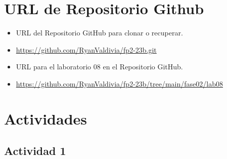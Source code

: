 \documentclass{article}
\begin{document}
	\section{URL de Repositorio Github}
	\begin{itemize}
		\item URL del Repositorio GitHub para clonar o recuperar.
		\item \url{https://github.com/RyanValdivia/fp2-23b.git}
		\item URL para el laboratorio 08 en el Repositorio GitHub.
		\item \url{https://github.com/RyanValdivia/fp2-23b/tree/main/fase02/lab08}
	\end{itemize}
	
	\section{Actividades}
	\subsection{Actividad 1}
	
\end{document}
